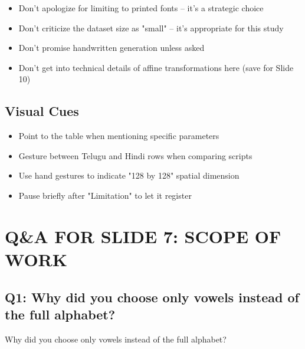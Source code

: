 \documentclass[11pt,a4paper]{article}
\begin{document}
\begin{warningbox}
\begin{itemize}[leftmargin=0.5cm]
    \item Don't apologize for limiting to printed fonts -- it's a strategic choice
    \item Don't criticize the dataset size as "small" -- it's appropriate for this study
    \item Don't promise handwritten generation unless asked
    \item Don't get into technical details of affine transformations here (save for Slide 10)
\end{itemize}
\end{warningbox}

\subsection{Visual Cues}

\begin{itemize}[leftmargin=1cm]
    \item Point to the table when mentioning specific parameters
    \item Gesture between Telugu and Hindi rows when comparing scripts
    \item Use hand gestures to indicate "128 by 128" spatial dimension
    \item Pause briefly after "Limitation" to let it register
\end{itemize}

\clearpage

\section{Q\&A FOR SLIDE 7: SCOPE OF WORK}

\subsection{Q1: Why did you choose only vowels instead of the full alphabet?}

\begin{qbox}[title=Question]
Why did you choose only vowels instead of the full alphabet?
\end{qbox}
\end{document}
